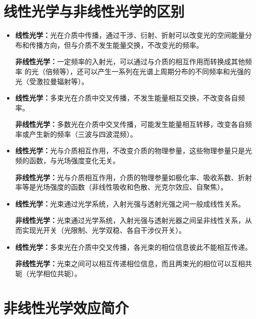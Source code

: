\documentclass{beamer}
\newenvironment{slide}{
    \begin{frame}{\bfseries{\sectiontitle}}
}{
    \end{frame}
}
\let\sectiononly\section
\renewcommand{\section}[1]{
    \sectiononly{#1}
    \let\sectiontitle\relax
    \newcommand{\sectiontitle}{#1}
}
\begin{document}
\section{线性光学与非线性光学的区别}

\begin{slide}
    \begin{itemize}
        \item \textbf{线性光学：}光在介质中传播，通过干涉、衍射、折射可以改变光的空间能量分布和传播方向，但与介质不发生能量交换，不改变光的频率。

        \textbf{非线性光学：}一定频率的入射光，可以通过与介质的相互作用而转换成其他频率 的光（倍频等），还可以产生一系列在光谱上周期分布的不同频率和光强的光（受激拉曼辐射等）。

        \item \textbf{线性光学：}多束光在介质中交叉传播，不发生能量相互交换，不改变各自频率。

        \textbf{非线性光学：}多数光在介质中交叉传播，可能发生能量相互转移，改变各自频率或产生新的频率（三波与四波混频）。
    \end{itemize}
\end{slide}

\begin{slide}
    \begin{itemize}
        \item \textbf{线性光学：}光与介质相互作用，不改变介质的物理参量，这些物理参量只是光频的函数，与光场强度变化无关。

        \textbf{非线性光学：}光与介质相互作用，介质的物理参量如极化率、吸收系数、折射率等是光场强度的函数（非线性吸收和色散、光克尔效应、自聚焦）。

        \item \textbf{线性光学：}光束通过光学系统，入射光强与透射光强之间一般成线性关系。

        \textbf{非线性光学：}光束通过光学系统，入射光强与透射光器之间呈非线性关系，从而实现光开关（光限制、光学双稳、各自干涉仪开关）。

        \item \textbf{线性光学：}多束光在介质中交叉传播，各光束的相位信息彼此不能相互传递。

        \textbf{非线性光学：}光束之间可以相互传递相位信息，而且两束光的相位可以互相共轭（光学相位共轭）。
    \end{itemize}
\end{slide}

\section{非线性光学效应简介}
\end{document}
